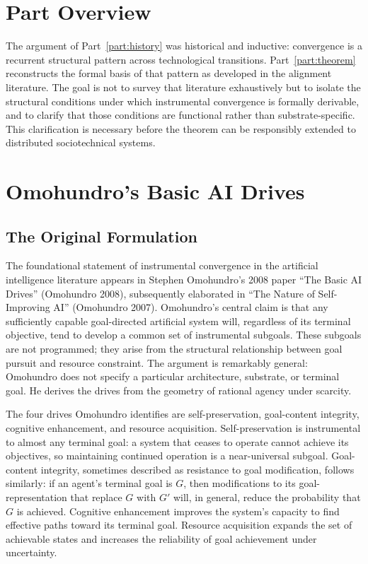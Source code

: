 \documentclass[12pt, oneside]{book}
\theoremstyle{plain}
\theoremstyle{definition}
\theoremstyle{remark}
\theoremstyle{definition}
\begin{document}
\chapter*{Part Overview}

The argument of Part~\ref{part:history} was historical and inductive: convergence
is a recurrent structural pattern across technological transitions. Part~\ref{part:theorem}
reconstructs the formal basis of that pattern as developed in the alignment literature.
The goal is not to survey that literature exhaustively but to isolate the structural
conditions under which instrumental convergence is formally derivable, and to clarify
that those conditions are functional rather than substrate-specific. This clarification
is necessary before the theorem can be responsibly extended to distributed
sociotechnical systems.

\chapter{Omohundro's Basic AI Drives}
\label{ch:omohundro}

\section{The Original Formulation}

The foundational statement of instrumental convergence in the artificial intelligence
literature appears in Stephen Omohundro's 2008 paper ``The Basic AI Drives''
(Omohundro 2008), subsequently elaborated in ``The Nature of Self-Improving AI''
(Omohundro 2007). Omohundro's central claim is that any sufficiently capable
goal-directed artificial system will, regardless of its terminal objective, tend to
develop a common set of instrumental subgoals. These subgoals are not programmed; they
arise from the structural relationship between goal pursuit and resource constraint.
The argument is remarkably general: Omohundro does not specify a particular
architecture, substrate, or terminal goal. He derives the drives from the geometry
of rational agency under scarcity.

The four drives Omohundro identifies are self-preservation, goal-content integrity,
cognitive enhancement, and resource acquisition. Self-preservation is instrumental
to almost any terminal goal: a system that ceases to operate cannot achieve its
objectives, so maintaining continued operation is a near-universal subgoal.
Goal-content integrity, sometimes described as resistance to goal modification,
follows similarly: if an agent's terminal goal is $G$, then modifications to its
goal-representation that replace $G$ with $G'$ will, in general, reduce the
probability that $G$ is achieved. Cognitive enhancement improves the system's
capacity to find effective paths toward its terminal goal. Resource acquisition
expands the set of achievable states and increases the reliability of goal
achievement under uncertainty.
\end{document}
